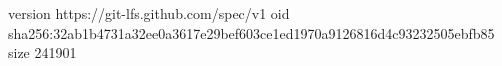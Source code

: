 version https://git-lfs.github.com/spec/v1
oid sha256:32ab1b4731a32ee0a3617e29bef603ce1ed1970a9126816d4c93232505ebfb85
size 241901
